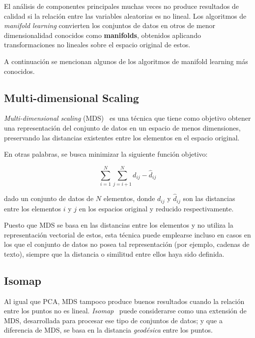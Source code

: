 El análisis de componentes principales muchas veces no produce resultados de calidad si la relación entre las variables aleatorias es no lineal.
Los algoritmos de \textit{manifold learning} convierten los conjuntos de datos en otros de menor dimensionalidad conocidos como \textbf{manifolds}, obtenidos aplicando transformaciones no lineales sobre el espacio original de estos.

A continuación se mencionan algunos de los algoritmos de manifold learning más conocidos.

\subsection{Multi-dimensional Scaling}\label{subsec:MDS}

\textit{Multi-dimensional scaling} (MDS)~\cite{deLeeuw00,Groenen14} es una técnica que tiene como objetivo obtener una representación del conjunto de datos en un espacio de menos dimensiones, preservando las distancias existentes entre los elementos en el espacio original.

En otras palabras, se busca minimizar la siguiente función objetivo:

\begin{equation}
    \label{eq:MDS}
    \sum_{i=1}^{N}\sum_{j=i+1}^{N}{d_{ij} - \hat{d}_{ij}}
\end{equation}

\noindent
dado un conjunto de datos de $N$ elementos, donde $d_{ij}$ y $\hat{d}_{ij}$ son las distancias entre los elementos $i$ y $j$ en los espacios original y reducido respectivamente.

Puesto que MDS se basa en las distancias entre los elementos y no utiliza la representación vectorial de estos, esta técnica puede emplearse incluso en casos en los que el conjunto de datos no posea tal representación (por ejemplo, cadenas de texto), siempre que la distancia o similitud entre ellos haya sido definida.

\subsection{Isomap}\label{subsec:isomap}

Al igual que PCA, MDS tampoco produce buenos resultados cuando la relación entre los puntos no es lineal.
\textit{Isomap}~\cite{Tenenbaum00} puede considerarse como una extensión de MDS, desarrollada para procesar ese tipo de conjuntos de datos; y que a diferencia de MDS, se basa en la distancia \textit{geodésica} entre los puntos.


